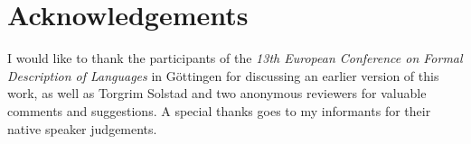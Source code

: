 \documentclass[output=paper]{langscibook}
\begin{document}
\section*{Acknowledgements}
I would like to thank the participants of the \textit{13th European Conference on
Formal Description of  Languages} in Göttingen for discussing an earlier version of this work, as well as Torgrim Solstad and two anonymous reviewers for valuable comments and suggestions. A special thanks goes to my informants for their native speaker judgements.

{\sloppy\printbibliography[heading=subbibliography,notkeyword=this]}
\end{document}
